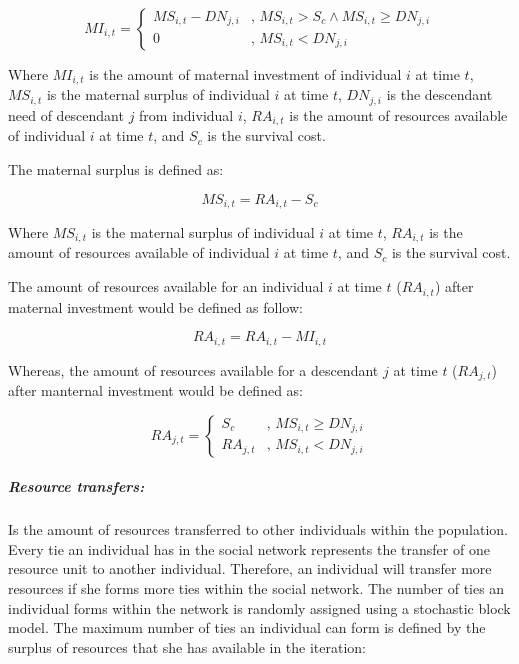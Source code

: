 \documentclass{article}
\begin{document}
\begin{equation}
    MI_{i,t}=\begin{cases}
    MS_{i,t}- DN_{j,i}& \text{, } MS_{i,t} > S_c \wedge MS_{i,t} \geq DN_{j,i}\\
    0 & \text{, } MS_{i,t} < DN_{j,i}
\end{cases}
\end{equation}

Where $MI_{i,t}$ is the amount of maternal investment of individual $i$ at time $t$, $MS_{i,t}$ is the maternal surplus of individual $i$ at time $t$, $DN_{j,i}$ is the descendant need of descendant $j$ from individual $i$, $RA_{i,t}$ is the amount of resources available of individual $i$ at time $t$, and $S_c$ is the survival cost.

The maternal surplus is defined as:

\begin{equation}
    MS_{i,t}=RA_{i,t}-S_c
\end{equation}

Where $MS_{i,t}$ is the maternal surplus of individual $i$ at time $t$, $RA_{i,t}$ is the amount of resources available of individual $i$ at time $t$, and $S_c$ is the survival cost.

The amount of resources available for an individual $i$ at time $t$ ($RA_{i,t}$) after maternal investment would be defined as follow:

\begin{equation}
    RA_{i,t}=RA_{i,t}-MI_{i,t}
\end{equation}

Whereas, the amount of resources available for a descendant $j$ at time $t$ ($RA_{j,t}$) after manternal investment would be defined as:

\begin{equation}
    RA_{j,t}=\begin{cases}
    S_c& \text{, } MS_{i,t} \geq DN_{j,i}\\
    RA_{j,t} & \text{, } MS_{i,t} < DN_{j,i}
\end{cases}
\end{equation}

\subparagraph{Resource transfers:}

Is the amount of resources transferred to other individuals within the population. Every tie an individual has in the social network represents the transfer of one resource unit to another individual. Therefore, an individual will transfer more resources if she forms more ties within the social network. The number of ties an individual forms within the network is randomly assigned using a stochastic block model. The maximum number of ties an individual can form is defined by the surplus of resources that she has available in the iteration:
\end{document}
